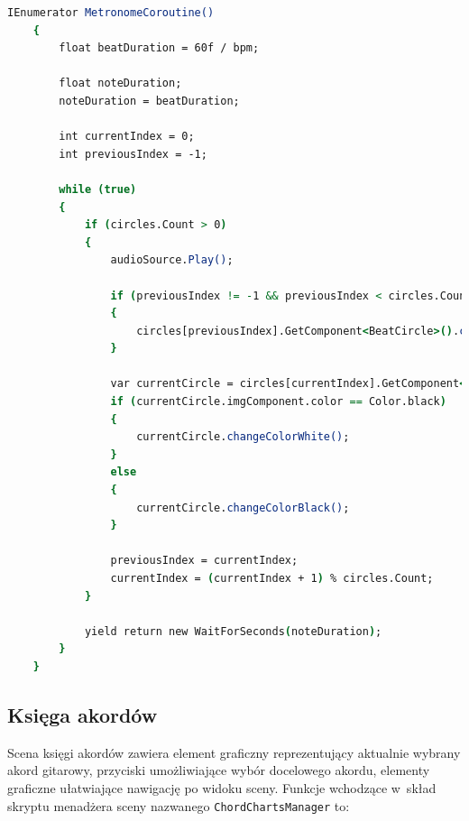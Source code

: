\begin{lstlisting}[language=csh,caption=Wątek \texttt{MetronomeCoroutine}, label=lst:2]
    IEnumerator MetronomeCoroutine()
    {
        float beatDuration = 60f / bpm;

        float noteDuration;
        noteDuration = beatDuration;

        int currentIndex = 0;
        int previousIndex = -1;

        while (true)
        {
            if (circles.Count > 0)
            {
                audioSource.Play();
                      
                if (previousIndex != -1 && previousIndex < circles.Count)
                {
                    circles[previousIndex].GetComponent<BeatCircle>().changeColorWhite();
                }
                
                var currentCircle = circles[currentIndex].GetComponent<BeatCircle>();
                if (currentCircle.imgComponent.color == Color.black)
                {
                    currentCircle.changeColorWhite();
                }
                else
                {
                    currentCircle.changeColorBlack();
                }

                previousIndex = currentIndex;
                currentIndex = (currentIndex + 1) % circles.Count;
            }
            
            yield return new WaitForSeconds(noteDuration);
        }
    }
\end{lstlisting}

\subsection{Księga akordów}
Scena księgi akordów zawiera element graficzny reprezentujący aktualnie wybrany akord gitarowy, przyciski umożliwiające wybór docelowego akordu, elementy graficzne ułatwiające nawigację po widoku sceny. Funkcje wchodzące w~skład skryptu menadżera sceny nazwanego \texttt{ChordChartsManager} to:

